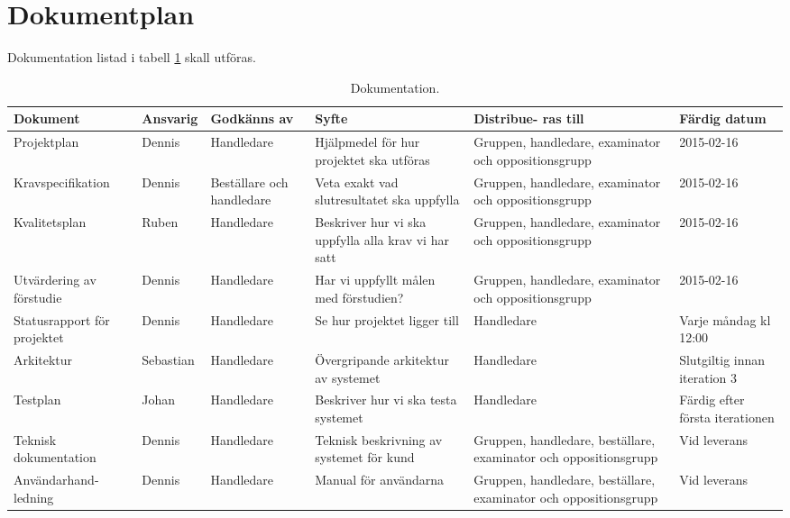 \section{Dokumentplan}
Dokumentation listad i tabell \ref{dokumentation:tabell} skall utföras.

\begin{table}[H]
	\centering
		\begin{tabularx}{\textwidth}{| p{25mm} | l | X | p{25mm} | X | X |}
			\hline
			\textbf{Dokument} & \textbf{Ansvarig} & \textbf{Godkänns av} & \textbf{Syfte} & \textbf{Distribue-
  ras till} & \textbf{Färdig datum} \\\hline

    		
			{Projektplan} & {Dennis} & {Handledare} & {Hjälpmedel för hur projektet ska utföras} & {Gruppen, handledare, examinator och oppositionsgrupp} & {2015-02-16} \\\hline
			
			{Kravspecifikation} & {Dennis} & {Beställare och handledare} & {Veta exakt vad slutresultatet ska uppfylla} & {Gruppen, handledare, examinator och oppositionsgrupp} & {2015-02-16} \\\hline
			
			{Kvalitetsplan} & {Ruben} & {Handledare} & {Beskriver hur vi ska uppfylla alla krav vi har satt} & {Gruppen, handledare, examinator och oppositionsgrupp} & {2015-02-16} \\\hline
			
						{Utvärdering av förstudie} & {Dennis} & {Handledare} & {Har vi uppfyllt målen med förstudien?} & {Gruppen, handledare, examinator och oppositionsgrupp} & {2015-02-16} \\\hline
			
			{Statusrapport för projektet} & {Dennis} & {Handledare} & {Se hur projektet ligger till} & {Handledare} & {Varje måndag kl 12:00} \\\hline
			
            {Arkitektur} & {Sebastian} & {Handledare} & {Övergripande arkitektur av systemet} & {Handledare} & {Slutgiltig innan iteration 3} \\\hline
               {Testplan} & {Johan} & {Handledare} & {Beskriver hur vi ska testa systemet} & {Handledare} & {Färdig efter första iterationen} \\\hline

          {Teknisk dokumentation} & {Dennis} & {Handledare} & {Teknisk beskrivning av systemet för kund} & {Gruppen, handledare, beställare, examinator och oppositionsgrupp} & {Vid leverans} \\\hline			
			
            {Användarhand-ledning} & {Dennis} & {Handledare} & {Manual för användarna} & {Gruppen, handledare, beställare, examinator och oppositionsgrupp} & {Vid leverans} \\\hline
            
			
			
		\end{tabularx}
	\caption{Dokumentation.} \label{dokumentation:tabell}
\end{table}
